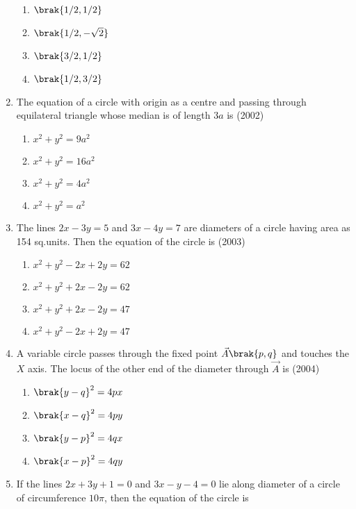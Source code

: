 \begin{enumerate}[label=\thesubsection.\arabic*.,ref=\thesubsection.\theenumi]
\begin{multicols}{4}
\begin{enumerate}
\item$\brak{1/2, 1/2}$
\item$\brak{1/2, -\sqrt{2}}$
\item$\brak{3/2, 1/2}$
\item$\brak{1/2, 3/2}$
\end{enumerate}
\end{multicols}
\item The equation of a circle with origin as a centre and passing through equilateral triangle whose median is of length $3a$ is \hfill(2002)
\begin{multicols}{2}
\begin{enumerate}
\item$x^2+y^2=9a^2$
\item$x^2+y^2=16a^2$
\item$x^2+y^2=4a^2$
\item$x^2+y^2=a^2$
\end{enumerate}
\end{multicols}
\item The lines $2x-3y=5$ and $3x-4y=7$ are diameters of a circle having area as 154 sq.units. Then the equation of the circle is
\hfill{(2003)}
\begin{multicols}{2}
\begin{enumerate}
\item $x^2+y^2-2x+2y=62$
\item $x^2+y^2+2x-2y=62$
\item $x^2+y^2+2x-2y=47$
\item $x^2+y^2-2x+2y=47$
\end{enumerate}
\end{multicols}
\item A variable circle passes through the fixed point $\vec{A}\brak{p, q}$ and touches the $X$ axis. The locus of the other end of the diameter through $\vec{A}$ is
\hfill{(2004)}
\begin{multicols}{2}
\begin{enumerate}
\item $\brak{y-q}^2=4px$
\item $\brak{x-q}^2=4py$ 
\item $\brak{y-p}^2=4qx$
\item $\brak{x-p}^2=4qy$
\end{enumerate}
\end{multicols}
\item If the lines $2x+3y+1=0$ and $3x-y-4=0$ lie along diameter of a circle of circumference $10\pi$,  then the equation of the circle is 

\end{enumerate}
